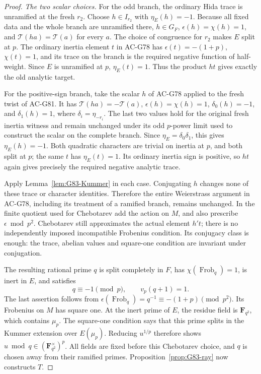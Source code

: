 \begin{proof}
\emph{The two scalar choices.}
For the odd branch, the ordinary Hida trace is unramified
at the fresh \(r_2\).  Choose \(h\in I_{r_2}\) with
\(\eta_E(h)=-1\).
Because all fixed data and the whole branch are unramified
there, \(h\in G_F\),
\(\epsilon(h)=\chi(h)=1\), and
\(\mathcal T(ha)=\mathcal T(a)\) for every \(a\).
The choice of congruence for \(r_2\) makes \(E\) split at \(p\).
The ordinary inertia element \(t\) in AC-G78 has
\(\epsilon(t)=-(1+p)\), \(\chi(t)=1\), and its trace on
the branch is the required negative function of half-weight.
Since \(E\) is unramified at \(p\), \(\eta_E(t)=1\).
Thus the product \(ht\) gives exactly the old analytic
target.

For the positive-sign branch, take the scalar \(h\) of
AC-G78 applied to the fresh twist of AC-G81.
It has \(\mathcal T(ha)=-\mathcal T(a)\),
\(\epsilon(h)=\chi(h)=1\),
\(\delta_0(h)=-1\), and \(\delta_1(h)=1\), where
\(\delta_i=\eta_{-r_i}\).
The last two values hold for the original fresh inertia
witness and remain unchanged under its odd \(p\)-power
limit used to construct the scalar on the complete branch.
Since \(\eta_E=\delta_0\delta_1\), this gives
\(\eta_E(h)=-1\).
Both quadratic characters are trivial on inertia at \(p\),
and both split at \(p\); the same \(t\) has
\(\eta_E(t)=1\).
Its ordinary inertia sign is positive, so \(ht\) again
gives precisely the required negative analytic trace.

Apply Lemma~\ref{lem:G83-Kummer} in each case.
Conjugating \(h\) changes none of these trace or character
identities.  Therefore the entire Weierstrass argument in
AC-G78, including its treatment of a ramified branch,
remains unchanged.  In the finite quotient used for
Chebotarev add the action on \(M\), and also prescribe
\(\epsilon\bmod p^2\).
Chebotarev still approximates the actual element \(h't\);
there is no independently imposed incompatible Frobenius
condition.
Its conjugacy class is enough: the trace, abelian values
and square-one condition are invariant under conjugation.

The resulting rational prime \(q\) is split completely
in \(F\), has \(\chi(\operatorname{Frob}_q)=1\),
is inert in \(E\), and satisfies
\[
 q\equiv-1\pmod p,\qquad v_p(q+1)=1.
\]
The last assertion follows from
\(\epsilon(\operatorname{Frob}_q)=q^{-1}
 \equiv-(1+p)\pmod{p^2}\).
Its Frobenius on \(M\) has square one.
At the inert prime of \(E\), the residue field is
\(\mathbf F_{q^2}\), which contains \(\mu_p\).
The square-one condition says that this prime splits
in the Kummer extension over \(E(\mu_p)\).
Reducing \(u^{1/p}\) therefore shows
\(u\bmod q\in(\mathbf F_{q^2}^{\times})^p\).
All fields are fixed before this Chebotarev choice, and
\(q\) is chosen away from their ramified primes.
Proposition~\ref{prop:G83-ray} now constructs \(T\).


\end{proof}
